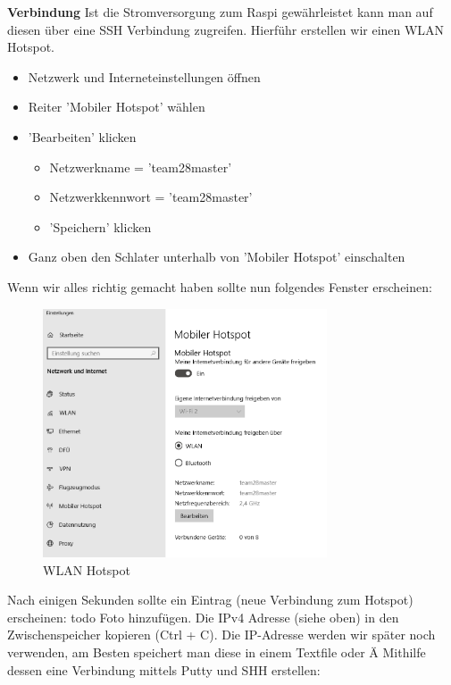 \documentclass[../../main.tex]{subfiles}
\begin{document}
\textbf{Verbindung}
Ist die Stromversorgung zum Raspi gewährleistet kann man auf diesen über eine SSH Verbindung zugreifen. Hierführ erstellen wir einen WLAN Hotspot.
\begin{itemize}
    \item Netzwerk und Interneteinstellungen öffnen
    \item Reiter 'Mobiler Hotspot' wählen
    \item 'Bearbeiten' klicken
    \begin{itemize}
        \item Netzwerkname = 'team28master'
        \item Netzwerkkennwort = 'team28master'
        \item 'Speichern' klicken
    \end{itemize}
    \item Ganz oben den Schlater unterhalb von 'Mobiler Hotspot' einschalten
\end{itemize}

Wenn wir alles richtig gemacht haben sollte nun folgendes Fenster erscheinen:
\begin{figure}[H] \centering
    \includegraphics[width=0.75\textwidth]{HotSpot}
    \caption{WLAN Hotspot}
    \label{fig:HotSpot}
\end{figure}

Nach einigen Sekunden sollte ein Eintrag (neue Verbindung zum Hotspot) erscheinen: {todo} Foto hinzufügen.
Die IPv4 Adresse (siehe oben) in den Zwischenspeicher kopieren (Ctrl + C). Die IP-Adresse werden wir später noch verwenden, am Besten speichert man diese in einem Textfile oder Ä
Mithilfe dessen eine Verbindung mittels Putty und SHH erstellen:
\end{document}

